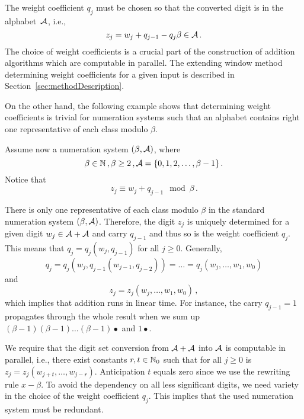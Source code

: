     The weight coefficient $q_j$ must be chosen so that the converted digit is in the alphabet~$\mathcal{A}$, i.e., 
    \begin{equation}
    \label{eq:conversionFormula}
        z_j=w_j + q_{j-1} - q_j \beta \in \mathcal{A}\,.
    \end{equation} 
    The choice of weight coefficients is a crucial part of the construction of addition algorithms which are computable in parallel. The extending window method determining weight coefficients for a given input is described in Section~\ref{sec:methodDescription}.
    
    
     On the other hand, the following example shows that determining weight coefficients is trivial for  numeration systems such that an alphabet contains right one representative of each class modulo $\beta$.
     
     \begin{exmp}
        Assume now a numeration system $(\beta, \mathcal{A})$, where
  $$
    \beta \in \mathbb{N}\,,\beta  \geq 2\,, \mathcal{A} = \{0, 1, 2,\dots, \beta -1 \}\,.
  $$ 
       Notice that
    $$
        z_j \equiv w_j+q_{j-1} \mod \beta\,. 
    $$
  
  There is only one representative of each class modulo  $\beta$ in the standard numeration system $(\beta, \mathcal{A})$. Therefore, the digit $z_j$ is uniquely determined for a given digit $w_j \in \mathcal{A}+\mathcal{A}$ and carry $q_{j-1}$ and thus so is the weight coefficient $q_j$. This means that $q_j=q_j(w_j,q_{j-1})$ for all $j\geq 0$. Generally,
  $$
  q_j=q_j(w_j,q_{j-1}(w_{j-1},q_{j-2}))=\dots =q_j(w_j ,\dots , w_1, w_0)
  $$
  and
  $$
  z_j=z_j(w_j ,\dots , w_1, w_0)\,,
  $$
  which implies that addition runs in linear time. For instance, the carry $q_{j-1}=1$ propagates through the whole result when we sum up $(\beta-1)(\beta-1)\dots(\beta-1)\bullet$ and $1\bullet$.
     
     \end{exmp}
  
  We require that the digit set conversion from $\mathcal{A}+\mathcal{A}$ into $\mathcal{A}$ is computable in parallel, i.e., there exist constants $r,t \in \mathbb{N}_0$ such that for all $j\geq 0$ is $z_j=z_j(w_{j+t},\dots,w_{j-r})$. Anticipation $t$ equals zero since we use the rewriting rule $x-\beta$. To avoid the dependency on all less significant digits, we need variety in the choice of the weight coefficient $q_j$. This implies that the used numeration system must be redundant.
  
